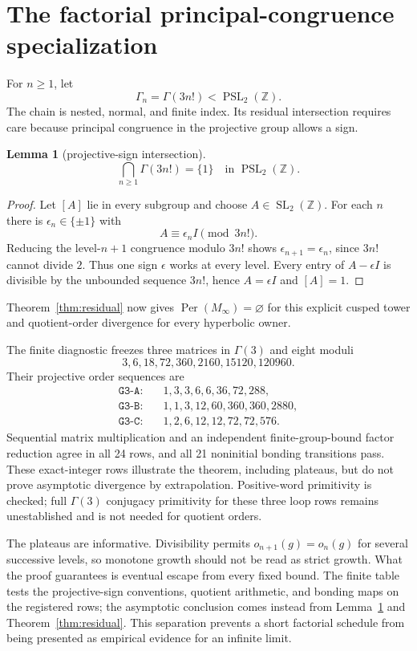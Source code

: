 \documentclass[11pt]{article}
\newtheorem{lemma}[theorem]{Lemma}
\theoremstyle{definition}
\theoremstyle{remark}
\newcommand{\ZZ}{\mathbb Z}
\newcommand{\Per}{\operatorname{Per}}
\begin{document}
\section{The factorial principal-congruence specialization}

For $n\geq1$, let
\[
\Gamma_n=\Gamma(3n!)<\operatorname{PSL}_2(\ZZ).
\]
The chain is nested, normal, and finite index. Its residual intersection requires care because principal congruence in the projective group allows a sign.

\begin{lemma}[projective-sign intersection]\label{lem:sign}
\[
\bigcap_{n\geq1}\Gamma(3n!)=\{1\}
\quad\text{in }\operatorname{PSL}_2(\ZZ).
\]
\end{lemma}

\begin{proof}
Let $[A]$ lie in every subgroup and choose $A\in\operatorname{SL}_2(\ZZ)$. For each $n$ there is $\epsilon_n\in\{\pm1\}$ with
\[
A\equiv\epsilon_nI\pmod{3n!}.
\]
Reducing the level-$n+1$ congruence modulo $3n!$ shows $\epsilon_{n+1}=\epsilon_n$, since $3n!$ cannot divide $2$. Thus one sign $\epsilon$ works at every level. Every entry of $A-\epsilon I$ is divisible by the unbounded sequence $3n!$, hence $A=\epsilon I$ and $[A]=1$.
\end{proof}

Theorem~\ref{thm:residual} now gives $\Per(M_\infty)=\varnothing$ for this explicit cusped tower and quotient-order divergence for every hyperbolic owner.

The finite diagnostic freezes three matrices in $\Gamma(3)$ and eight moduli
\[
3,6,18,72,360,2160,15120,120960.
\]
Their projective order sequences are
\begin{align*}
\texttt{G3-A}:&\quad1,3,3,6,6,36,72,288,\\
\texttt{G3-B}:&\quad1,1,3,12,60,360,360,2880,\\
\texttt{G3-C}:&\quad1,2,6,12,12,72,72,576.
\end{align*}
Sequential matrix multiplication and an independent finite-group-bound factor reduction agree in all 24 rows, and all 21 noninitial bonding transitions pass. These exact-integer rows illustrate the theorem, including plateaus, but do not prove asymptotic divergence by extrapolation. Positive-word primitivity is checked; full $\Gamma(3)$ conjugacy primitivity for these three loop rows remains unestablished and is not needed for quotient orders.

The plateaus are informative. Divisibility permits $o_{n+1}(g)=o_n(g)$ for several successive levels, so monotone growth should not be read as strict growth. What the proof guarantees is eventual escape from every fixed bound. The finite table tests the projective-sign conventions, quotient arithmetic, and bonding maps on the registered rows; the asymptotic conclusion comes instead from Lemma~\ref{lem:sign} and Theorem~\ref{thm:residual}. This separation prevents a short factorial schedule from being presented as empirical evidence for an infinite limit.
\end{document}
